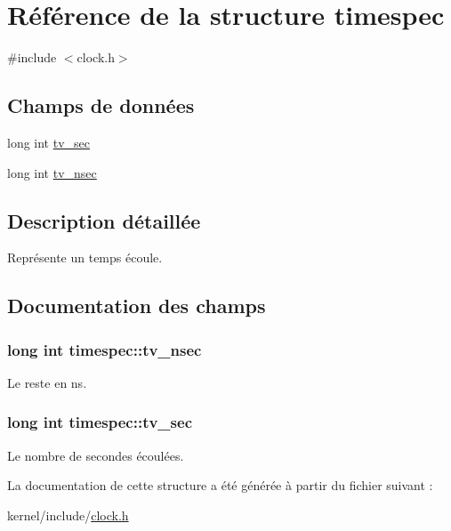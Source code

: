 \hypertarget{structtimespec}{\section{Référence de la structure timespec}
\label{structtimespec}
}


{\ttfamily \#include $<$clock.\-h$>$}

\subsection*{Champs de données}
\begin{DoxyCompactItemize}
\item 
long int \hyperlink{structtimespec_af632894a12c37dea87073c0126f99fff}{tv\-\_\-sec}
\item 
long int \hyperlink{structtimespec_aa9689622a344d847333e534ac23d3093}{tv\-\_\-nsec}
\end{DoxyCompactItemize}


\subsection{Description détaillée}
Représente un temps écoule. 

\subsection{Documentation des champs}
\hypertarget{structtimespec_aa9689622a344d847333e534ac23d3093}{
\subsubsection[{tv\-\_\-nsec}]{\setlength{\rightskip}{0pt plus 5cm}long int timespec\-::tv\-\_\-nsec}}\label{structtimespec_aa9689622a344d847333e534ac23d3093}
Le reste en ns. \hypertarget{structtimespec_af632894a12c37dea87073c0126f99fff}{
\subsubsection[{tv\-\_\-sec}]{\setlength{\rightskip}{0pt plus 5cm}long int timespec\-::tv\-\_\-sec}}\label{structtimespec_af632894a12c37dea87073c0126f99fff}
Le nombre de secondes écoulées. 

La documentation de cette structure a été générée à partir du fichier suivant \-:\begin{DoxyCompactItemize}
\item 
kernel/include/\hyperlink{clock_8h}{clock.\-h}\end{DoxyCompactItemize}
